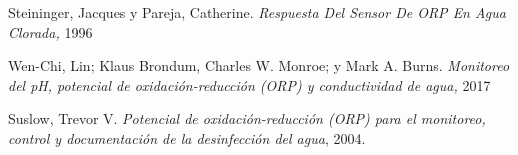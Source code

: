 \begin{thebibliography}{99}
    Steininger, Jacques y Pareja, Catherine. 
    \textit{Respuesta Del Sensor De ORP En Agua Clorada,} 1996
    
    Wen-Chi, Lin; Klaus Brondum, Charles W. Monroe; y Mark A. Burns. \textit{Monitoreo del pH, potencial de oxidación-reducción (ORP) y conductividad de agua,}  2017
    
    Suslow, Trevor V. \textit{Potencial de oxidación-reducción (ORP) para el monitoreo, control y documentación de la desinfección del agua}, 2004.
    \end{thebibliography}
    
